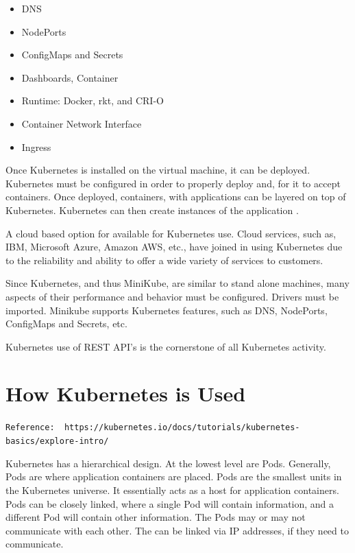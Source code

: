 \begin{itemize}
    \item DNS 
    
    \item NodePorts 
    
    \item ConfigMaps and Secrets 
    
    \item Dashboards, Container 
    
    \item Runtime:  Docker, rkt, and CRI-O 
    
    \item Container Network Interface
    
    \item Ingress  
 \end{itemize}   
 
Once Kubernetes is installed on the virtual machine, it can be
deployed.  Kubernetes must be configured in order to properly deploy
and, for it to accept containers.  Once deployed, containers, with
applications can be layered on top of Kubernetes.  Kubernetes can then
create instances of the application  \cite{hid-sp18-525-concept}.

A cloud based option for available for Kubernetes use.  Cloud
services, such as, IBM, Microsoft Azure, Amazon AWS, etc., have joined
in using Kubernetes due to the reliability and ability to offer a wide
variety of services to customers.   

Since Kubernetes, and thus MiniKube, are similar to stand alone
machines, many aspects of their performance and behavior must be
configured.  Drivers must be imported.  Minikube supports Kubernetes
features, such as DNS, NodePorts, ConfigMaps and Secrets, etc.   

Kubernetes use of REST API's is the cornerstone of all Kubernetes activity.  


\section{How Kubernetes is Used}


\verb|Reference:  https://kubernetes.io/docs/tutorials/kubernetes-basics/explore-intro/|

Kubernetes has a hierarchical design.  At the lowest level are Pods.
Generally, Pods are where application containers are placed.  Pods are
the smallest units in the Kubernetes universe.  It essentially acts as
a host for application containers.  Pods can be closely linked, where
a single Pod will contain information, and a different Pod will
contain other information.  The Pods may or may not communicate with
each other.  The can be linked via IP addresses, if they need to
communicate.   

